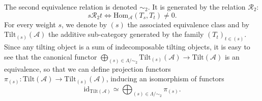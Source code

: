 \documentclass[11pt]{amsart}
\theoremstyle{plain}
\theoremstyle{remark}
\numberwithin{equation}{section}
\begin{document}
	The second equivalence relation is denoted $\sim_2$. It is generated by the relation $\mathscr{R}_2$:
	$$s\mathscr{R}_2 t\Leftrightarrow \mathrm{Hom}_\mathcal{A}(T_s,T_t)\neq 0.$$
	For every weight $s$, we denote by $(s)$ the associated equivalence class and by $\mathrm{Tilt}_{(s)}(\mathcal{A})$ the additive sub-category generated by the family $(T_t)_{t\in(s)}$. Since any tilting object is a sum of indecomposable tilting objects, it is easy to see that the canonical functor  $\bigoplus_{(s)\in\Lambda/\sim_2}\mathrm{Tilt}_{(s)}(\mathcal{A})\to \mathrm{Tilt}(\mathcal{A})$ is an equivalence, so that we can define projection functors $\pi_{(s)}:\mathrm{Tilt}(\mathcal{A})\to \mathrm{Tilt}_{(s)}(\mathcal{A})$, inducing an isomorphism of functors 
	$$\mathrm{id}_{\mathrm{Tilt}(\mathcal{A})}\simeq\bigoplus_{(s)\in\Lambda/\sim_2}\pi_{(s)}.$$
	
\end{document}
